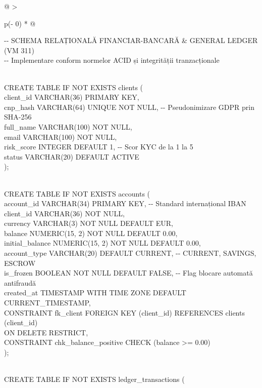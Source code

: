 \documentclass[
]{article}
\begin{document}
\begin{longtable}[]{@{}
  >{\raggedright\arraybackslash}p{(\columnwidth - 0\tabcolsep) * }@{}}
\toprule\noalign{}
\begin{minipage}[b]{\linewidth}\raggedright
-\/- SCHEMA RELAȚIONALĂ FINANCIAR-BANCARĂ \& GENERAL LEDGER (VM 311)\\
-\/- Implementare conform normelor ACID și integrității tranzacționale\\
\strut \\
CREATE TABLE IF NOT EXISTS clients (\\
client\_id VARCHAR(36) PRIMARY KEY,\\
cnp\_hash VARCHAR(64) UNIQUE NOT NULL, -\/- Pseudonimizare GDPR prin
SHA-256\\
full\_name VARCHAR(100) NOT NULL,\\
email VARCHAR(100) NOT NULL,\\
risk\_score INTEGER DEFAULT 1, -\/- Scor KYC de la 1 la 5\\
status VARCHAR(20) DEFAULT \textquotesingle ACTIVE\textquotesingle{}\\
);\\
\strut \\
CREATE TABLE IF NOT EXISTS accounts (\\
account\_id VARCHAR(34) PRIMARY KEY, -\/- Standard internațional IBAN\\
client\_id VARCHAR(36) NOT NULL,\\
currency VARCHAR(3) NOT NULL DEFAULT
\textquotesingle EUR\textquotesingle,\\
balance NUMERIC(15, 2) NOT NULL DEFAULT 0.00,\\
initial\_balance NUMERIC(15, 2) NOT NULL DEFAULT 0.00,\\
account\_type VARCHAR(20) DEFAULT
\textquotesingle CURRENT\textquotesingle, -\/- CURRENT, SAVINGS,
ESCROW\\
is\_frozen BOOLEAN NOT NULL DEFAULT FALSE, -\/- Flag blocare automată
antifraudă\\
created\_at TIMESTAMP WITH TIME ZONE DEFAULT CURRENT\_TIMESTAMP,\\
CONSTRAINT fk\_client FOREIGN KEY (client\_id) REFERENCES clients
(client\_id)\\
ON DELETE RESTRICT,\\
CONSTRAINT chk\_balance\_positive CHECK (balance \textgreater= 0.00)\\
);\\
\strut \\
CREATE TABLE IF NOT EXISTS ledger\_transactions (\\

\end{minipage}
\end{longtable}
\end{document}
